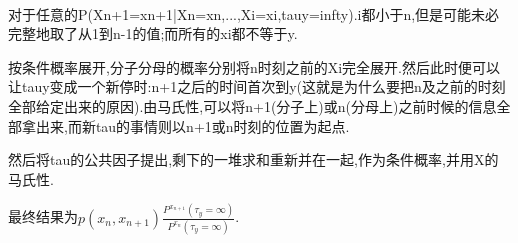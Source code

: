 \documentclass[a4paper,oneside]{ctexbook}
\begin{document}
		\begin{pf}[木师姐的证明]
			\label{mu}
			\ 

			对于任意的P(Xn+1=xn+1|Xn=xn,...,Xi=xi,tauy=infty).i都小于n,但是可能未必完整地取了从1到n-1的值;而所有的xi都不等于y.

			按条件概率展开,分子分母的概率分别将n时刻之前的Xi完全展开.然后此时便可以让tauy变成一个新停时:n+1之后的时间首次到y(这就是为什么要把n及之前的时刻全部给定出来的原因).由马氏性,可以将n+1(分子上)或n(分母上)之前时候的信息全部拿出来,而新tau的事情则以n+1或n时刻的位置为起点.

			然后将tau的公共因子提出,剩下的一堆求和重新并在一起,作为条件概率,并用X的马氏性.

			最终结果为$p(x_n,x_{n+1})\displaystyle\frac
			{P^{x_{n+1}}(\tau_y=\infty)}
			{P^{x_{n}}(\tau_y=\infty)}$.

		\end{pf}
\end{document}
